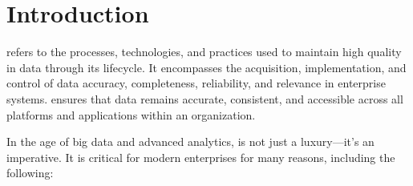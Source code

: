 \chapter*{Introduction}

 refers to the processes, technologies, and practices used to maintain high quality in data through its lifecycle. It encompasses the acquisition, implementation, and control of data accuracy, completeness, reliability, and relevance in enterprise systems.  ensures that data remains accurate, consistent, and accessible across all platforms and applications within an organization.

In the age of big data and advanced analytics,  is not just a luxury—it's an imperative. It is critical for modern enterprises for many reasons, including the following:


